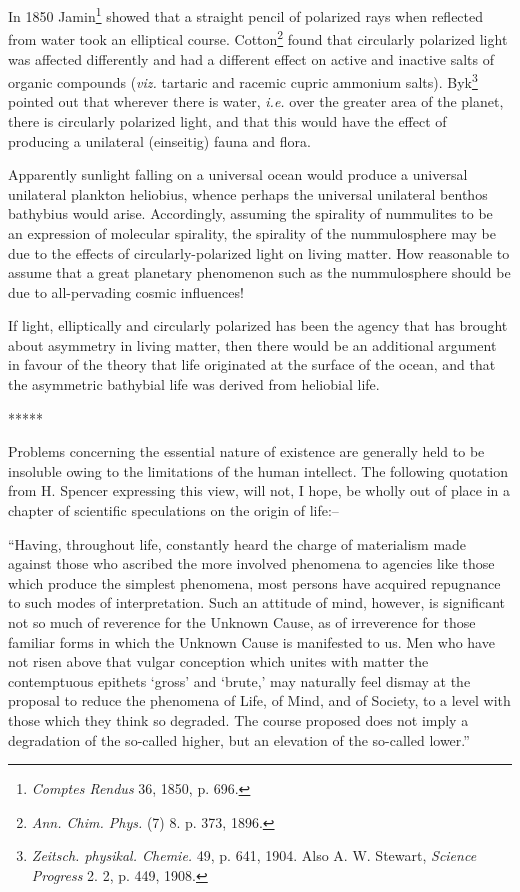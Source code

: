 \documentclass[a4paper, 12pt, oneside, landscape]{article}
\begin{document}
In 1850 Jamin\footnote{\emph{Comptes Rendus} 36, 1850, p. 696.} showed that a straight pencil of polarized rays when reflected from water took an elliptical course. Cotton\footnote{\emph{Ann. Chim. Phys.} (7) 8. p. 373, 1896.} found that circularly polarized light was affected differently and had a different effect on active and inactive salts of organic compounds (\emph{viz.} tartaric and racemic cupric ammonium salts). Byk\footnote{\emph{Zeitsch. physikal. Chemie.} 49, p. 641, 1904. Also A. W. Stewart, \emph{Science Progress} 2. 2, p. 449, 1908.} pointed out that wherever there is water, \emph{i.e.} over the greater area of the planet, there is circularly polarized light, and that this would have the effect of producing a unilateral (einseitig) fauna and flora.

Apparently sunlight falling on a universal ocean would produce a universal unilateral plankton heliobius, whence perhaps the universal unilateral benthos bathybius would arise. Accordingly, assuming the spirality of nummulites to be an expression of molecular spirality, the spirality of the nummulosphere may be due to the effects of circularly-polarized light on living matter. How reasonable to assume that a great planetary phenomenon such as the nummulosphere should be due to all-pervading cosmic influences!

If light, elliptically and circularly polarized has been the agency that has brought about asymmetry in living matter, then there would be an additional argument in favour of the theory that life originated at the surface of the ocean, and that the asymmetric bathybial life was derived from heliobial life.

\centerline{*\hspace{15mm}*\hspace{15mm}*\hspace{15mm}*\hspace{15mm}*}
\bigskip

Problems concerning the essential nature of existence are generally held to be insoluble owing to the limitations of the human intellect. The following quotation from H. Spencer expressing this view, will not, I hope, be wholly out of place in a chapter of scientific speculations on the origin of life:--

``Having, throughout life, constantly heard the charge of materialism made against those who ascribed the more involved phenomena to agencies like those which produce the simplest phenomena, most persons have acquired repugnance to such modes of interpretation. Such an attitude of mind, however, is significant not so much of reverence for the Unknown Cause, as of irreverence for those familiar forms in which the Unknown Cause is manifested to us. Men who have not risen above that vulgar conception which unites with matter the contemptuous epithets `gross' and `brute,' may naturally feel dismay at the proposal to reduce the phenomena of Life, of Mind, and of Society, to a level with those which they think so degraded. The course proposed does not imply a degradation of the so-called higher, but an elevation of the so-called lower.''
\end{document}
